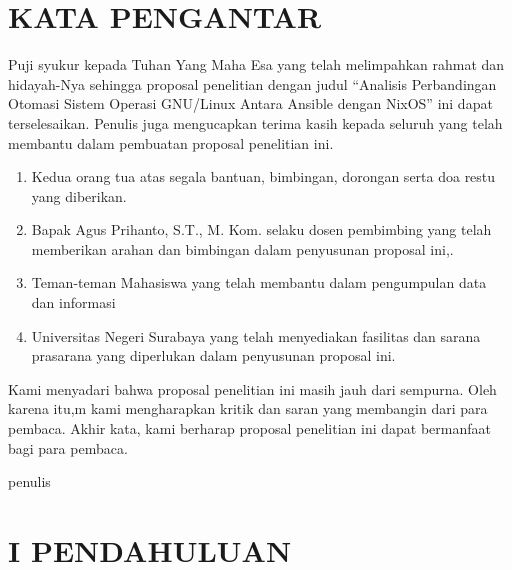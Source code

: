 \documentclass[10pt,]{report}
\begin{document}

\chapter*{KATA PENGANTAR}
\begin{justify}
	Puji syukur kepada Tuhan Yang Maha Esa yang telah melimpahkan rahmat dan
	hidayah-Nya sehingga proposal penelitian dengan judul “Analisis Perbandingan
	Otomasi Sistem Operasi GNU/Linux Antara Ansible dengan NixOS” ini
	dapat terselesaikan. Penulis juga mengucapkan terima kasih kepada seluruh
	yang telah membantu dalam pembuatan proposal penelitian ini.
	\begin{enumerate}
		\item Kedua orang tua atas segala bantuan, bimbingan, dorongan serta doa restu yang diberikan.
		\item Bapak Agus Prihanto, S.T., M. Kom. selaku dosen pembimbing yang telah memberikan arahan dan bimbingan dalam penyusunan proposal ini,.
		\item Teman-teman Mahasiswa yang telah membantu dalam pengumpulan data dan informasi
		\item Universitas Negeri Surabaya yang telah menyediakan fasilitas dan sarana prasarana yang diperlukan dalam penyusunan proposal ini.
	\end{enumerate}
	Kami menyadari bahwa proposal penelitian ini masih jauh dari sempurna. Oleh karena itu,m kami mengharapkan kritik dan saran yang membangin dari para pembaca.
	Akhir kata, kami berharap proposal penelitian ini dapat bermanfaat bagi para pembaca.
\end{justify}
\begin{FlushRight}
	penulis
\end{FlushRight}
\chapter{{I} PENDAHULUAN}
\end{document}
